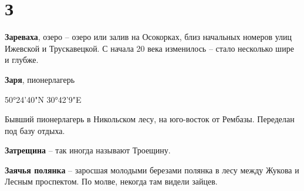 \chapter*{З}

\textbf{Зареваха}, озеро – озеро или залив на Осокорках, близ начальных номеров улиц Ижевской и Трускавецкой. С начала 20 века изменилось – стало несколько шире и глубже.\\

\medskip

\textbf{Заря}, пионерлагерь 

50°24'40"N 30°42'9"E

Бывший пионерлагерь в Никольском лесу, на юго-восток от Рембазы. Переделан под базу отдыха.\\

\medskip

\textbf{Затрещина} – так иногда называют Троещину.\\

\medskip


\textbf{Заячья полянка} – заросшая молодыми березами полянка в лесу между Жукова и Лесным проспектом. По молве, некогда там видели зайцев.
